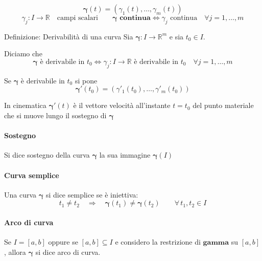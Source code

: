 \documentclass[x11names]{article}
\begin{document}
	\[
	\boldsymbol{\gamma}(t) = \left(\gamma_1(t),\dots,\gamma_m(t)\right)
	\]
	\[
	\gamma_j:I\to\mathbb{R} \quad \text{campi scalari} \qquad \boldsymbol{\gamma}\textbf{ continua}\Longleftrightarrow \gamma_j \text{ continua}\quad \forall j=1,\dots,m
	\]
	
	\begin{center}
		\colorbox{myblue}{\begin{minipage}{5.75in}
				\begin{blues}{Definizione: Derivabilità di una curva}
					Sia \(\boldsymbol{\gamma}:I\to \mathbb{R}^m\)  e sia \(t_0 \in I\).
					
					Diciamo che 
					\[
					\boldsymbol{\gamma} \text{ è derivabile in } t_0 \Longleftrightarrow \gamma_j:I\to\mathbb{R} \text{ è derivabile in } t_0 \quad \forall j =1,\dots,m 
					\]
					
					Se \(\boldsymbol{\gamma}\) è derivabile in \(t_0\) si pone
					\[
					\boldsymbol{\gamma'}(t_0) = \left(\gamma'_1(t_0),\dots,\gamma'_m(t_0)\right)
					\]
					
					In cinematica \(\boldsymbol{\gamma'}(t)\) è il vettore velocità all'instante \(t=t_0\) del punto materiale che si muove lungo il sostegno di \(\boldsymbol{\gamma}\)
				\end{blues}
		\end{minipage}}       
	\end{center}
	
	
	
	\paragraph{Sostegno} Si dice sostegno della curva \(\boldsymbol{\gamma}\) la sua immagine \(\boldsymbol{\gamma}(I)\)
	\paragraph{Curva semplice} Una curva \(\boldsymbol{\gamma}\) si dice semplice se è iniettiva:
	\[
	t_1 \neq t_2 \quad \Longrightarrow \quad \boldsymbol{\gamma}(t_1) \neq \boldsymbol{\gamma}(t_2) \qquad \forall \,t_1,t_2 \in I
	\]
	\paragraph{Arco di curva} Se \(I=[a,b]\) oppure se \([a,b] \subseteq I\) e considero la restrizione di \(\boldsymbol{gamma}\) su \([a,b]\), allora \(\boldsymbol{\gamma}\) si dice arco di curva.
	
\end{document}
